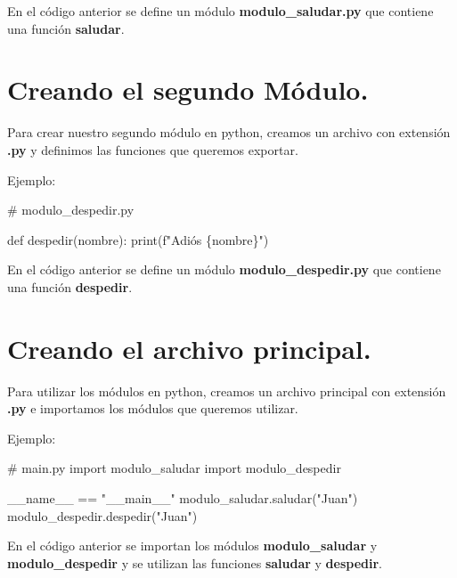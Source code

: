 \documentclass[
  a4paper,
  DIV=11,
  numbers=noendperiod,
  onepage,
  openany]{scrreprt}
\newenvironment{Shaded}{\begin{snugshade}}{\end{snugshade}}
\newcommand{\BuiltInTok}[1]{\textcolor[rgb]{0.00,0.23,0.31}{#1}}
\newcommand{\CommentTok}[1]{\textcolor[rgb]{0.37,0.37,0.37}{#1}}
\newcommand{\ImportTok}[1]{\textcolor[rgb]{0.00,0.46,0.62}{#1}}
\newcommand{\KeywordTok}[1]{\textcolor[rgb]{0.00,0.23,0.31}{#1}}
\newcommand{\NormalTok}[1]{\textcolor[rgb]{0.00,0.23,0.31}{#1}}
\newcommand{\OperatorTok}[1]{\textcolor[rgb]{0.37,0.37,0.37}{#1}}
\newcommand{\SpecialCharTok}[1]{\textcolor[rgb]{0.37,0.37,0.37}{#1}}
\newcommand{\SpecialStringTok}[1]{\textcolor[rgb]{0.13,0.47,0.30}{#1}}
\newcommand{\StringTok}[1]{\textcolor[rgb]{0.13,0.47,0.30}{#1}}
\newcommand{\VariableTok}[1]{\textcolor[rgb]{0.07,0.07,0.07}{#1}}
\begin{document}
En el código anterior se define un módulo \textbf{modulo\_saludar.py}
que contiene una función \textbf{saludar}.

\section{Creando el segundo
Módulo.}\label{creando-el-segundo-muxf3dulo.}

Para crear nuestro segundo módulo en python, creamos un archivo con
extensión \textbf{.py} y definimos las funciones que queremos exportar.

Ejemplo:

\begin{Shaded}
\begin{Highlighting}[]
\CommentTok{\# modulo\_despedir.py}

\KeywordTok{def}\NormalTok{ despedir(nombre):}
    \BuiltInTok{print}\NormalTok{(}\SpecialStringTok{f"Adiós }\SpecialCharTok{\{}\NormalTok{nombre}\SpecialCharTok{\}}\SpecialStringTok{"}\NormalTok{)}
\end{Highlighting}
\end{Shaded}

En el código anterior se define un módulo \textbf{modulo\_despedir.py}
que contiene una función \textbf{despedir}.

\section{Creando el archivo
principal.}\label{creando-el-archivo-principal.}

Para utilizar los módulos en python, creamos un archivo principal con
extensión \textbf{.py} e importamos los módulos que queremos utilizar.

Ejemplo:

\begin{Shaded}
\begin{Highlighting}[]
\CommentTok{\# main.py}
\ImportTok{import}\NormalTok{ modulo\_saludar}
\ImportTok{import}\NormalTok{ modulo\_despedir}

\VariableTok{\_\_name\_\_} \OperatorTok{==} \StringTok{"\_\_main\_\_"}
\NormalTok{modulo\_saludar.saludar(}\StringTok{"Juan"}\NormalTok{)}
\NormalTok{modulo\_despedir.despedir(}\StringTok{"Juan"}\NormalTok{)}
\end{Highlighting}
\end{Shaded}

En el código anterior se importan los módulos \textbf{modulo\_saludar} y
\textbf{modulo\_despedir} y se utilizan las funciones \textbf{saludar} y
\textbf{despedir}.
\end{document}
